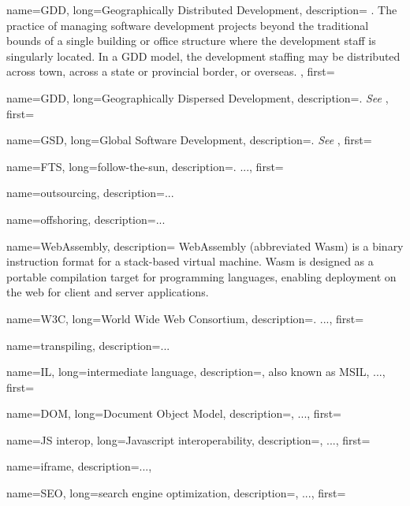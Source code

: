 {
    name=GDD, 
    long={Geographically Distributed Development},
    description={
        . The practice of managing software development projects
        beyond the traditional bounds of a single building or office structure where
        the development staff is singularly located. In a GDD model, the development
        staffing may be distributed across town, across a state or provincial
        border, or overseas. \autocite{Yuhong_2008}
    }, 
    first=
    }

{
    name=GDD,
    long={Geographically Dispersed Development},
    description={. \textit{See} },
    first=
}

{
    name=GSD,
    long={Global Software Development},
    description={. \textit{See} },
    first=
}

{
    name=FTS,
    long={follow-the-sun},
    description={. ...}, %
    first=
}

{
    name=outsourcing, 
    description={...} %
}


{
    name=offshoring, 
    description={...} %
}


{
    name=WebAssembly, 
    description={
        WebAssembly (abbreviated Wasm) is a binary instruction format for a
        stack-based virtual machine. Wasm is designed as a portable compilation
        target for programming languages, enabling deployment on the web for client
        and server applications.\autocite{Webassembly_2021}
    }
}

{
    name=W3C,
    long={World Wide Web Consortium},
    description={. ...},%
    first=
}

{
    name=transpiling, 
    description={...} %
}

{
    name=IL,
    long={intermediate language},
    description={, also known as MSIL, ...},%
    first=
}

{
    name=DOM,
    long={Document Object Model},
    description={, ...},%
    first=
}

{
    name=JS interop,
    long={Javascript interoperability},
    description={, ...},%
    first=
}

{
    name=iframe,
    description={...},%
}

{
    name=SEO,
    long={search engine optimization},
    description={, ...},%
    first=
}
‌